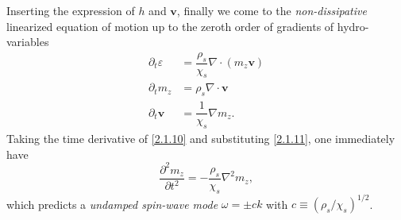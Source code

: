 \documentclass[10pt,nofootinbib]{revtex4}
\begin{document}
			Inserting the expression of $h$ and $\bm{v}$, finally we come to the \emph{non-dissipative} linearized equation of motion up to the zeroth order of gradients of hydro-variables
			\begin{align}
				\partial_t\varepsilon&=\dfrac{\rho_s}{\chi_s}\nabla\cdot(m_z\bm{v})\label{2.1.9}\\
				\partial_t m_z&=\rho_s\nabla\cdot\bm{v}\label{2.1.10}\\
				\partial_t \bm{v}&=\dfrac{1}{\chi_s}\nabla m_z\label{2.1.11}.
			\end{align}
			Taking the time derivative of \eqref{2.1.10} and substituting \eqref{2.1.11}, one immediately have
			\begin{equation}\label{2.1.12}
				\dfrac{\partial^2 m_z}{\partial t^2}=-\dfrac{\rho_s}{\chi_s}\nabla^2m_z,
			\end{equation}
			which predicts a \emph{undamped spin-wave mode} $\omega=\pm ck$ with $c\equiv(\rho_s/\chi_s)^{1/2}$.
\end{document}
